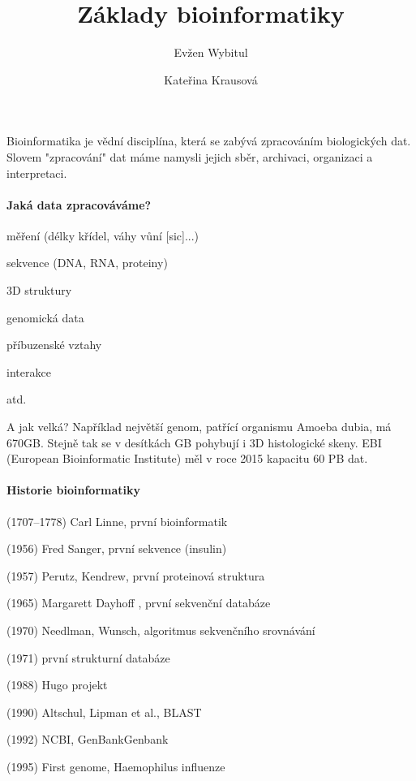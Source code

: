 \documentclass[DIV=8]{scrreprt}
\title{Základy bioinformatiky}
\author{Evžen Wybitul \and Kateřina Krausová}
\begin{document}
\begin{titlepage}
\maketitle
\end{titlepage}
\tableofcontents



Bioinformatika je vědní disciplína, která se zabývá zpracováním biologických dat. Slovem "zpracování" dat máme namysli jejich sběr, archivaci, organizaci a interpretaci.

\paragraph{Jaká data zpracováváme?}
\begin{myItemize}[nosep]
    \item měření (délky křídel, váhy vůní [sic]...)
    \item sekvence (DNA, RNA, proteiny)
    \item 3D struktury
    \item genomická data
    \item příbuzenské vztahy
    \item interakce
    \item atd.
\end{myItemize}



A jak velká? Například největší genom, patřící organismu Amoeba dubia, má 670GB. Stejně tak se v desítkách GB pohybují i 3D histologické skeny. EBI (European Bioinformatic Institute) měl v roce 2015 kapacitu 60 PB dat.

\paragraph{Historie bioinformatiky}
\begin{myItemize}[nosep]
    \item (1707--1778) Carl Linne, první bioinformatik
    \item (1956) Fred Sanger, první sekvence (insulin)
    \item (1957) Perutz, Kendrew, první proteinová struktura
    \item (1965) Margarett Dayhoff , první sekvenční databáze
    \item (1970) Needlman, Wunsch, algoritmus sekvenčního srovnávání
    \item (1971) první strukturní databáze
    \item (1988) Hugo projekt
    \item (1990) Altschul, Lipman et al., BLAST
    \item (1992) NCBI, GenBankGenbank
    \item (1995) First genome, Haemophilus influenze
\end{myItemize}
\end{document}
